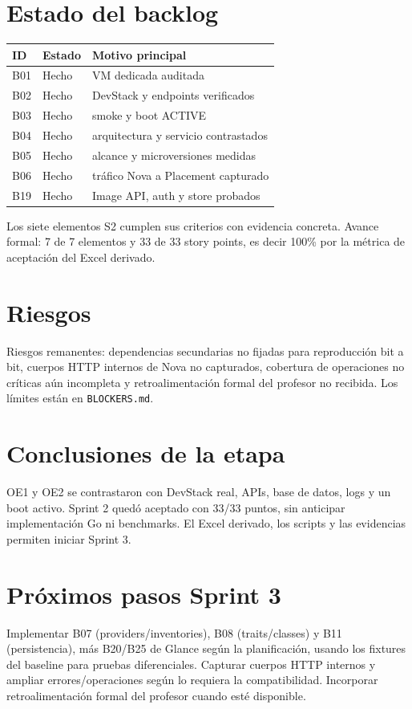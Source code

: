 \documentclass[10pt,a4paper]{article}
\begin{document}
\section{Estado del backlog}
\begin{center}\begin{tabular}{lll}\toprule
ID & Estado & Motivo principal\\\midrule
B01 & Hecho & VM dedicada auditada\\
B02 & Hecho & DevStack y endpoints verificados\\
B03 & Hecho & smoke y boot ACTIVE\\
B04 & Hecho & arquitectura y servicio contrastados\\
B05 & Hecho & alcance y microversiones medidas\\
B06 & Hecho & tráfico Nova a Placement capturado\\
B19 & Hecho & Image API, auth y store probados\\\bottomrule
\end{tabular}\end{center}
Los siete elementos S2 cumplen sus criterios con evidencia concreta. Avance formal: 7 de 7 elementos y 33 de 33 story points, es decir 100\% por la métrica de aceptación del Excel derivado.

\section{Riesgos}
Riesgos remanentes: dependencias secundarias no fijadas para reproducción bit a bit, cuerpos HTTP internos de Nova no capturados, cobertura de operaciones no críticas aún incompleta y retroalimentación formal del profesor no recibida. Los límites están en \texttt{BLOCKERS.md}.

\section{Conclusiones de la etapa}
OE1 y OE2 se contrastaron con DevStack real, APIs, base de datos, logs y un boot activo. Sprint 2 quedó aceptado con 33/33 puntos, sin anticipar implementación Go ni benchmarks. El Excel derivado, los scripts y las evidencias permiten iniciar Sprint 3.

\section{Próximos pasos Sprint 3}
Implementar B07 (providers/inventories), B08 (traits/classes) y B11 (persistencia), más B20/B25 de Glance según la planificación, usando los fixtures del baseline para pruebas diferenciales. Capturar cuerpos HTTP internos y ampliar errores/operaciones según lo requiera la compatibilidad. Incorporar retroalimentación formal del profesor cuando esté disponible.
\end{document}
